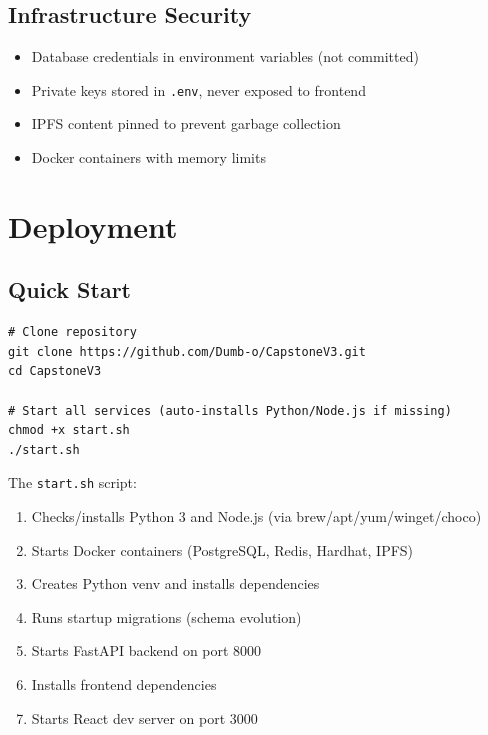 \documentclass[12pt,a4paper]{article}
\begin{document}
\subsection{Infrastructure Security}
\begin{itemize}[nosep]
    \item Database credentials in environment variables (not committed)
    \item Private keys stored in \texttt{.env}, never exposed to frontend
    \item IPFS content pinned to prevent garbage collection
    \item Docker containers with memory limits
\end{itemize}

\section{Deployment}

\subsection{Quick Start}

\begin{lstlisting}[basicstyle=\ttfamily\small]
# Clone repository
git clone https://github.com/Dumb-o/CapstoneV3.git
cd CapstoneV3

# Start all services (auto-installs Python/Node.js if missing)
chmod +x start.sh
./start.sh
\end{lstlisting}

The \texttt{start.sh} script:
\begin{enumerate}[nosep]
    \item Checks/installs Python 3 and Node.js (via brew/apt/yum/winget/choco)
    \item Starts Docker containers (PostgreSQL, Redis, Hardhat, IPFS)
    \item Creates Python venv and installs dependencies
    \item Runs startup migrations (schema evolution)
    \item Starts FastAPI backend on port 8000
    \item Installs frontend dependencies
    \item Starts React dev server on port 3000
\end{enumerate}
\end{document}
